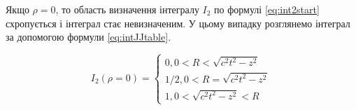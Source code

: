 Якщо $ \rho = 0 $, то область визначення інтегралу $ I_2 $ по формулі 
\eqref{eq:int2start} схропується і інтеграл стає невизначеним. У цьому випадку 
розглянемо інтеграл за допомогою формули \eqref{eq:intJJtable}.


\begin{equation}
I_2 \left( \rho = 0 \right) = \begin{cases}
0, 0 < R < \sqrt{c^2t^2 - z^2} \\
1/2, 0 < R = \sqrt{c^2t^2 - z^2} \\ 
1, 0 < \sqrt{c^2t^2 - z^2} < R 
\end{cases}
\end{equation}
